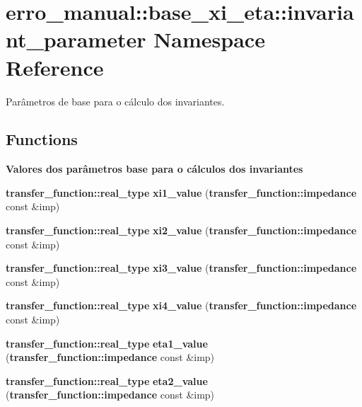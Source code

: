 \section{erro\_\-manual::base\_\-xi\_\-eta::invariant\_\-parameter Namespace Reference}
\label{namespaceerro__manual_1_1base__xi__eta_1_1invariant__parameter}
Parâmetros de base para o cálculo dos invariantes.  


\subsection*{Functions}
\begin{Indent}{\bf Valores dos parâmetros base para o cálculos dos invariantes}\par
\begin{CompactItemize}
\item 
{\bf transfer\_\-function::real\_\-type} \textbf{xi1\_\-value} ({\bf transfer\_\-function::impedance} const \&imp)\label{namespaceerro__manual_1_1base__xi__eta_1_1invariant__parameter_a12590db746f86a961543e090e0cfe59}

\item 
{\bf transfer\_\-function::real\_\-type} \textbf{xi2\_\-value} ({\bf transfer\_\-function::impedance} const \&imp)\label{namespaceerro__manual_1_1base__xi__eta_1_1invariant__parameter_6eeec0189fbdb3466613000a78ece272}

\item 
{\bf transfer\_\-function::real\_\-type} \textbf{xi3\_\-value} ({\bf transfer\_\-function::impedance} const \&imp)\label{namespaceerro__manual_1_1base__xi__eta_1_1invariant__parameter_78eacddd8e04c2f7ee2994b29af8261f}

\item 
{\bf transfer\_\-function::real\_\-type} \textbf{xi4\_\-value} ({\bf transfer\_\-function::impedance} const \&imp)\label{namespaceerro__manual_1_1base__xi__eta_1_1invariant__parameter_6c01fa3f2448db0685eb1374f8ea6fd2}

\item 
{\bf transfer\_\-function::real\_\-type} \textbf{eta1\_\-value} ({\bf transfer\_\-function::impedance} const \&imp)\label{namespaceerro__manual_1_1base__xi__eta_1_1invariant__parameter_e241ab91b368b123bf67ecd07e96c004}

\item 
{\bf transfer\_\-function::real\_\-type} \textbf{eta2\_\-value} ({\bf transfer\_\-function::impedance} const \&imp)\label{namespaceerro__manual_1_1base__xi__eta_1_1invariant__parameter_980388cc6d0026dbe5061ca43cf9884d}


\end{CompactItemize}
\end{Indent}
